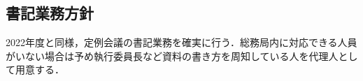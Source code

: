 \subsection*{書記業務方針}

2022年度と同様，定例会議の書記業務を確実に行う．総務局内に対応できる人員がいない場合は予め執行委員長など資料の書き方を周知している人を代理人として用意する．

